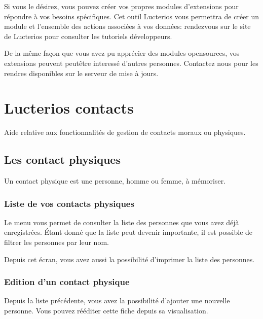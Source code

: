 \documentclass[letterpaper,10pt,french]{sphinxmanual}
\begin{document}
Si vous le désirez, vous pouvez créer vos propres modules d’extensions pour répondre à vos besoins spécifiques.
Cet outil Lucterios vous permettra de créer un module et l’ensemble des actions associées à vos données: rendez\sphinxhyphen{}vous sur le site de Lucterios pour consulter les tutoriels développeurs.

De la même façon que vous avez pu apprécier des modules open\sphinxhyphen{}sources, vos extensions peuvent peut\sphinxhyphen{}être interessé d’autres personnes.
Contactez nous pour les rendres disponibles sur le serveur de mise à jours.
\begin{quote}


\end{quote}


\chapter{Lucterios contacts}
\label{\detokenize{contacts/index:lucterios-contacts}}\label{\detokenize{contacts/index::doc}}
Aide relative aux fonctionnalités de gestion de contacts moraux ou physiques.


\section{Les contact physiques}
\label{\detokenize{contacts/individual:les-contact-physiques}}\label{\detokenize{contacts/individual::doc}}
Un contact physique est une personne, homme ou femme, à mémoriser.


\subsection{Liste de vos contacts physiques}
\label{\detokenize{contacts/individual:liste-de-vos-contacts-physiques}}
Le menu  vous permet de consulter la liste des personnes que vous avez déjà enregistrées. Étant donné que la liste peut devenir importante, il est possible de filtrer les personnes par leur nom.

Depuis cet écran, vous avez aussi la possibilité d’imprimer la liste des personnes.

\noindent{}


\subsection{Edition d’un contact physique}
\label{\detokenize{contacts/individual:edition-d-un-contact-physique}}
Depuis la liste précédente, vous avez la possibilité d’ajouter une nouvelle personne. Vous pouvez ré\sphinxhyphen{}éditer cette fiche depuis sa visualisation.
\end{document}
